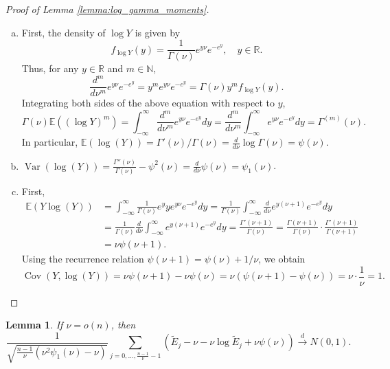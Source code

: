 \documentclass[12pt,letterpaper, twoside, openany]{article}
\DeclareMathOperator*{\Var}{Var}
\DeclareMathOperator*{\Cov}{Cov}
\theoremstyle{plain}
\newtheorem{lemma}[theorem]{Lemma}
\begin{document}
\begin{proof}[Proof of Lemma \ref{lemma:log_gamma_moments}]
\begin{enumerate}[(a)]
\item First, the density of $\log Y$ is given by
\begin{equation*}
    f_{\log Y}(y) = \frac{1}{\Gamma(\nu)}e^{y \nu} e^{-e^y},\quad y \in \mathbb{R}.
\end{equation*}
Thus, for any $y \in \mathbb{R}$ and $m \in \mathbb{N}$,
\begin{equation*}
    \frac{d^m}{d \nu^m} e^{y \nu} e^{-e^y} = y^m e^{y\nu} e^{-e^y} = \Gamma(\nu) y^m f_{\log Y}(y).
\end{equation*}
Integrating both sides of the above equation with respect to $y$,
\begin{equation*}
\Gamma(\nu)		\mathbb{E}((\log Y)^m) 
=  \int^\infty_{-\infty} \frac{d^m}{d \nu^m} e^{y \nu} e^{-e^y} dy 
= \frac{d^m}{d\nu^m}  \int^\infty_{-\infty} e^{y \nu} e^{-e^y} dy 
= \Gamma^{(m)}(\nu).
\end{equation*}
In particular, $\mathbb{E}(\log(Y)) = \Gamma'(\nu)/\Gamma(\nu) = \frac{d}{d\nu} \log \Gamma(\nu) = \psi(\nu)$.
\item $\Var(\log (Y)) = \frac{\Gamma''(\nu)}{\Gamma(\nu)} - \psi^2(\nu) = \frac{d}{d\nu } \psi(\nu) = \psi_1(\nu)$.
%
\item First,
\begin{align*}
    \mathbb{E}(Y\log(Y)) &=  \int^\infty_{-\infty} \frac{1}{\Gamma(\nu)} e^y y e^{y\nu} e^{-e^y} dy 
    = \frac{1}{\Gamma(\nu)}  \int^\infty_{-\infty} \frac{d}{d\nu} e^{y(\nu+1)} e^{-e^y} dy \\
    &= \frac{1}{\Gamma(\nu)}  \frac{d}{d\nu} \int^\infty_{-\infty} e^{y(\nu+1)} e^{-e^y} dy
    = \frac{\Gamma'(\nu+1)}{\Gamma(\nu)} = \frac{\Gamma(\nu+1)}{\Gamma(\nu)} \cdot \frac{\Gamma'(\nu+1)}{\Gamma(\nu+1)}\\
    & = \nu\psi(\nu+1).
\end{align*}
Using the recurrence relation $\psi(\nu+1) = \psi(\nu) + 1/\nu$, we obtain
\begin{equation*}
    \Cov(Y,\log(Y)) = \nu\psi(\nu+1) - \nu\psi(\nu) = \nu (\psi(\nu+1) - \psi(\nu)) = \nu \cdot\frac{1}{\nu} = 1.
\end{equation*}
\end{enumerate}
\end{proof}



\begin{lemma}\label{lemma:main_term_distribution_free}
If $\nu = o(n)$, then
	\begin{equation}\label{eq:asy_dist_3}
		\frac{1}{\sqrt{\frac{n-1}{\nu} (\nu^2 \psi_1(\nu) - \nu)}} \sum_{j=0,\ldots, \frac{n-1}{\nu}-1}(\tilde{E}_j - \nu - \nu \log \tilde{E}_j + \nu\psi(\nu)) \stackrel{d}{\rightarrow} N(0, 1).
	\end{equation}
\end{lemma}
\end{document}
